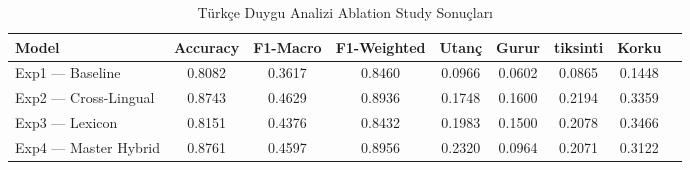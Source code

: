 \begin{table}[htbp]
  \centering
  \caption{Türkçe Duygu Analizi Ablation Study Sonuçları}
  \label{tab:ablation}
  \begin{tabular}{lcccccccc}
  \toprule
  Model & Accuracy & F1-Macro & F1-Weighted & Utanç & Gurur & tiksinti & Korku \\
  \midrule
  Exp1 — Baseline & 0.8082 & 0.3617 & 0.8460 & 0.0966 & 0.0602 & 0.0865 & 0.1448 \\
  Exp2 — Cross-Lingual & 0.8743 & 0.4629 & 0.8936 & 0.1748 & 0.1600 & 0.2194 & 0.3359 \\
  Exp3 — Lexicon & 0.8151 & 0.4376 & 0.8432 & 0.1983 & 0.1500 & 0.2078 & 0.3466 \\
  Exp4 — Master Hybrid & 0.8761 & 0.4597 & 0.8956 & 0.2320 & 0.0964 & 0.2071 & 0.3122 \\
  \bottomrule
  \end{tabular}
\end{table}